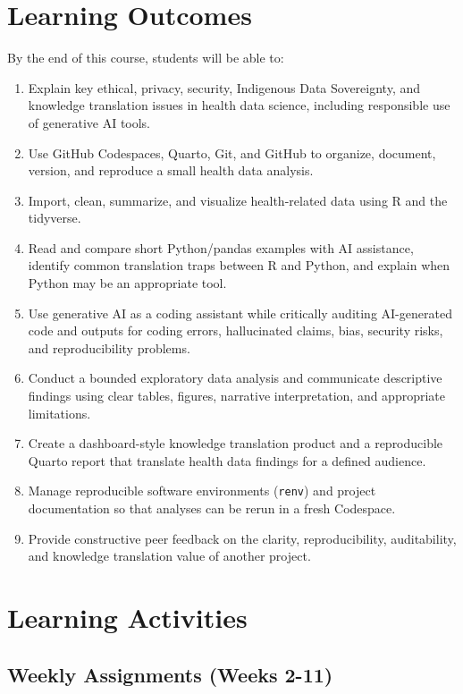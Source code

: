 \documentclass[
  letterpaper,
  DIV=11,
  numbers=noendperiod,
  oneside]{scrreprt}
\providecommand{\tightlist}{%
  \setlength{\itemsep}{0pt}\setlength{\parskip}{0pt}}
\begin{document}
\section{Learning Outcomes}\label{learning-outcomes}

By the end of this course, students will be able to:

\begin{enumerate}
\def\labelenumi{\arabic{enumi}.}
\tightlist
\item
  Explain key ethical, privacy, security, Indigenous Data Sovereignty,
  and knowledge translation issues in health data science, including
  responsible use of generative AI tools.
\item
  Use GitHub Codespaces, Quarto, Git, and GitHub to organize, document,
  version, and reproduce a small health data analysis.
\item
  Import, clean, summarize, and visualize health-related data using R
  and the tidyverse.
\item
  Read and compare short Python/pandas examples with AI assistance,
  identify common translation traps between R and Python, and explain
  when Python may be an appropriate tool.
\item
  Use generative AI as a coding assistant while critically auditing
  AI-generated code and outputs for coding errors, hallucinated claims,
  bias, security risks, and reproducibility problems.
\item
  Conduct a bounded exploratory data analysis and communicate
  descriptive findings using clear tables, figures, narrative
  interpretation, and appropriate limitations.
\item
  Create a dashboard-style knowledge translation product and a
  reproducible Quarto report that translate health data findings for a
  defined audience.
\item
  Manage reproducible software environments (\texttt{renv}) and project
  documentation so that analyses can be rerun in a fresh Codespace.
\item
  Provide constructive peer feedback on the clarity, reproducibility,
  auditability, and knowledge translation value of another project.
\end{enumerate}

\section{Learning Activities}\label{learning-activities}

\subsection{Weekly Assignments (Weeks
2-11)}\label{weekly-assignments-weeks-2-11}
\end{document}
